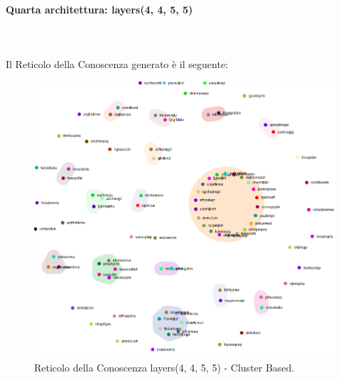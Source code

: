 \paragraph{Quarta architettura: layers(4, 4, 5, 5)}\mbox{}\\\\
\label{Quarta architettura}
\noindent
Il Reticolo della Conoscenza generato è il seguente:
\begin{figure}[H]
\centering
	\includegraphics[width=0.70\linewidth]{./image/logica(4,4,5,5).png}
	\caption{Reticolo della Conoscenza layers(4, 4, 5, 5) - Cluster Based.}
	\label{Reticolo della Conoscenza layers(4, 4, 5, 5) - Cluster Based.}
\end{figure}
\noindent

